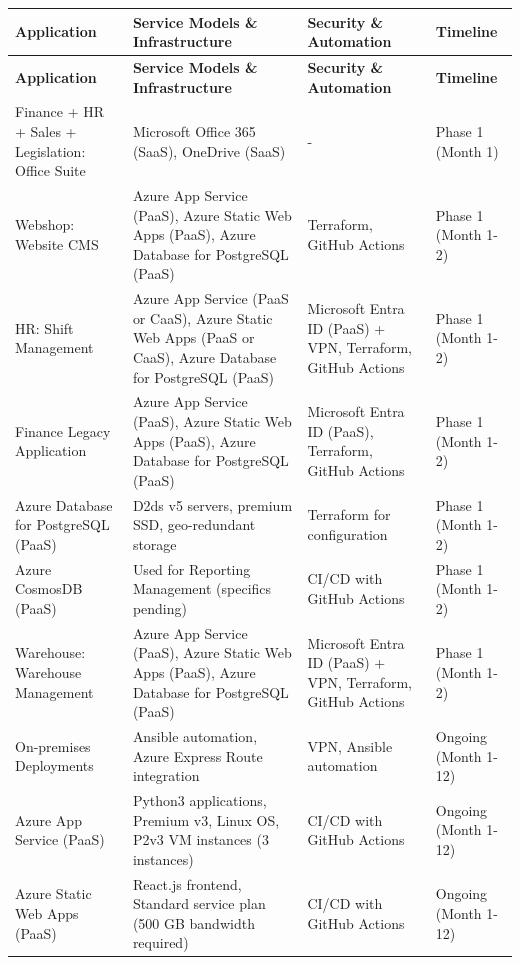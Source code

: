 \documentclass{llncs}
\begin{document}
\begin{longtable}{|p{3.1cm}|p{5.2cm}|p{3.1cm}|l|}
    \hline
    \textbf{Application} & \textbf{Service Models \& Infrastructure} & \textbf{Security \& Automation} & \textbf{Timeline} \\
    \hline
    \endfirsthead
    \hline
    \textbf{Application} & \textbf{Service Models \& Infrastructure} & \textbf{Security \& Automation} & \textbf{Timeline} \\
    \hline
    \endhead
    \hline
    \endfoot
    \hline
    
    Finance + HR + Sales + Legislation: Office Suite & Microsoft Office 365 (SaaS), OneDrive (SaaS) & - & Phase 1 (Month 1) \\
    \hline
    Webshop: Website CMS & Azure App Service (PaaS), Azure Static Web Apps (PaaS), Azure Database for PostgreSQL (PaaS) & Terraform, GitHub Actions & Phase 1 (Month 1-2) \\
    \hline
    HR: Shift Management & Azure App Service (PaaS or CaaS), Azure Static Web Apps (PaaS or CaaS), Azure Database for PostgreSQL (PaaS) & Microsoft Entra ID (PaaS) + VPN, Terraform, GitHub Actions & Phase 1 (Month 1-2) \\
    \hline
    Finance Legacy Application & Azure App Service (PaaS), Azure Static Web Apps (PaaS), Azure Database for PostgreSQL (PaaS) & Microsoft Entra ID (PaaS), Terraform, GitHub Actions & Phase 1 (Month 1-2) \\
    \hline
    Azure Database for PostgreSQL (PaaS) & D2ds v5 servers, premium SSD, geo-redundant storage & Terraform for configuration & Phase 1 (Month 1-2) \\
    \hline
    Azure CosmosDB (PaaS) & Used for Reporting Management (specifics pending) & CI/CD with GitHub Actions & Phase 1 (Month 1-2) \\
    \hline
    Warehouse: Warehouse Management & Azure App Service (PaaS), Azure Static Web Apps (PaaS), Azure Database for PostgreSQL (PaaS) & Microsoft Entra ID (PaaS) + VPN, Terraform, GitHub Actions & Phase 1 (Month 1-2) \\
    \hline
    On-premises Deployments & Ansible automation, Azure Express Route integration & VPN, Ansible automation & Ongoing (Month 1-12) \\
    \hline
    Azure App Service (PaaS) & Python3 applications, Premium v3, Linux OS, P2v3 VM instances (3 instances) & CI/CD with GitHub Actions & Ongoing (Month 1-12) \\
    \hline
    Azure Static Web Apps (PaaS) & React.js frontend, Standard service plan (500 GB bandwidth required) & CI/CD with GitHub Actions & Ongoing (Month 1-12) \\

\end{longtable}
\end{document}
